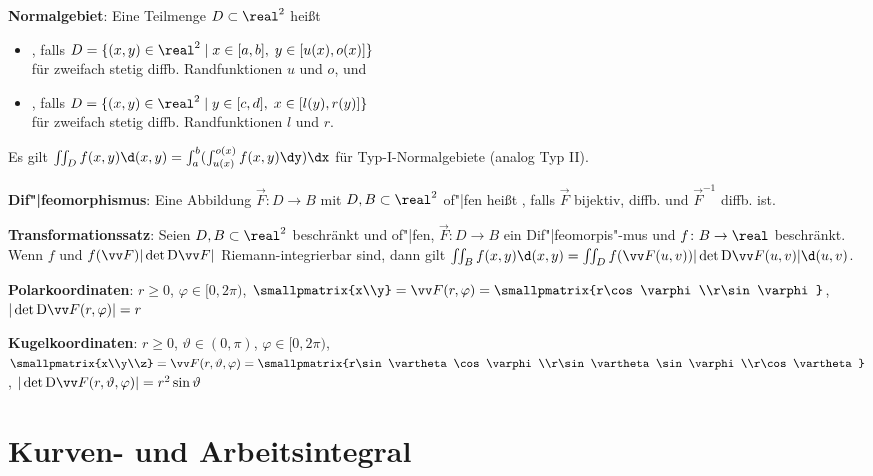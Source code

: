 \linie

\textbf{Normalgebiet}:
Eine Teilmenge $D \subset \real^2$ heißt
\begin{itemize}
    \item
    ,
    falls $D = \{(x, y) \in \real^2 \;|\; x \in [a, b],\; y \in [u(x), o(x)]\}$\\
    für zweifach stetig diffb. Randfunktionen $u$ und $o$, und

    \item
    ,
    falls $D = \{(x, y) \in \real^2 \;|\; y \in [c, d],\; x \in [l(y), r(y)]\}$\\
    für zweifach stetig diffb. Randfunktionen $l$ und $r$.
\end{itemize}
Es gilt $\iint_D f(x, y) \d(x,y) = \int_a^b (\int_{u(x)}^{o(x)} f(x, y) \dy) \dx$
für Typ-I-Normalgebiete (analog Typ II).

\linie

\textbf{Dif"|feomorphismus}:
Eine Abbildung $\vec{F}\colon D \to B$ mit $D, B \subset \real^2$ of"|fen
heißt , falls
$\vec{F}$ bijektiv, diffb. und $\vec{F}^{-1}$ diffb. ist.

\textbf{Transformationssatz}:
Seien $D, B \subset \real^2$ beschränkt und of"|fen,
$\vec{F}\colon D \to B$ ein Dif"|feomorpis"-mus und $f\colon B \to \real$ beschränkt.
Wenn $f$ und $f(\vec{F}) |\det \D\vec{F}|$ Riemann-integrierbar sind,
dann gilt $\iint_B f(x, y) \d(x, y) = \iint_D f(\vec{F}(u, v)) |\det \D\vec{F}(u, v)| \d(u,v)$.

\textbf{Polarkoordinaten}:
$r \ge 0$, $\varphi \in [0, 2\pi)$,
$\smallpmatrix{x\\y} = \vec{F}(r, \varphi) = \smallpmatrix{r\cos\varphi\\r\sin\varphi}$,
$|\det \D\vec{F}(r, \varphi)| = r$

\textbf{Kugelkoordinaten}:
$r \ge 0$, $\vartheta \in (0, \pi)$, $\varphi \in [0, 2\pi)$,\\
$\smallpmatrix{x\\y\\z} = \vec{F}(r, \vartheta, \varphi) =
\smallpmatrix{r\sin\vartheta\cos\varphi\\r\sin\vartheta\sin\varphi\\r\cos\vartheta}$,
$|\det \D\vec{F}(r, \vartheta, \varphi)| = r^2 \sin\vartheta$

\pagebreak

\section{%
    Kurven- und Arbeitsintegral%
}

